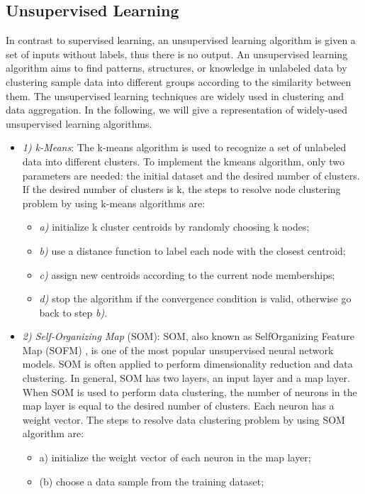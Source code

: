 \subsection{Unsupervised Learning}
In contrast to supervised learning, an unsupervised learning algorithm is given a set of inputs without labels, thus there is no output. An unsupervised learning algorithm aims to find patterns, structures, or knowledge in unlabeled data by clustering sample data into different groups according to the similarity between them. The unsupervised learning techniques are widely used in clustering and data aggregation. In the following, we will give a representation of widely-used unsupervised learning algorithms.
\begin{itemize}
\item[]\textit{1)	k-Means}: The k-means algorithm is used to recognize a set of unlabeled data into different clusters. To implement the kmeans algorithm, only two parameters are needed: the initial dataset and the desired number of clusters. If the desired number of clusters is k, the steps to resolve node clustering problem by using k-means algorithms are:
\begin{itemize}
\item[]\textit{a)} initialize k cluster centroids by randomly choosing k nodes;
\item[]\textit{b)} use a distance function to label each node with the closest centroid;
\item[]\textit{c)} assign new centroids according to the current node memberships;
\item[]\textit{d)} stop the algorithm if the convergence condition is valid, otherwise go back to step \textit{b)}.
\end{itemize}
\item[]\textit{2)	Self-Organizing Map} (SOM): SOM, also known as SelfOrganizing Feature Map (SOFM) \cite{Kohonen2012}, is one of the most popular unsupervised neural network models. SOM is often applied to perform dimensionality reduction and data clustering. In general, SOM has two layers, an input layer and a map layer. When SOM is used to perform data clustering, the number of neurons in the map layer is equal to the desired number of clusters. Each neuron has a weight vector. The steps to resolve data clustering problem by using SOM algorithm are:
\begin{itemize}
\item[]a) initialize the weight vector of each neuron in the map layer;
\item[](b) choose a data sample from the training dataset;

\end{itemize}
\end{itemize}
